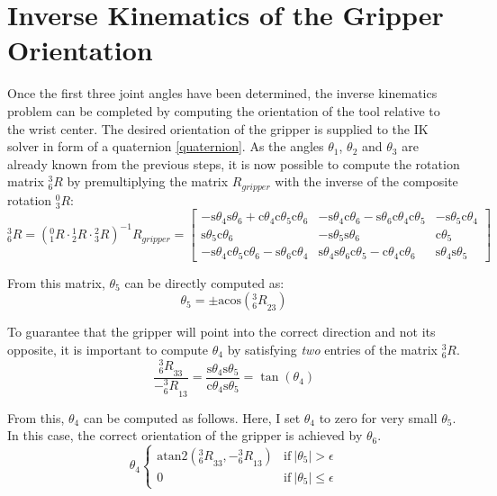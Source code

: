 \documentclass[twoside]{article}
\renewcommand{\c}{\text{c}}
\newcommand{\s}{\text{s}}
\newcommand{\R}[2]{\mbox{$_{#2}^{#1}{R}$}}
\newcommand{\acos}{\text{acos}}
\begin{document}
\section{Inverse Kinematics of the Gripper Orientation}
Once the first three joint angles have been determined, the inverse kinematics problem can be
completed by computing the orientation of the tool relative to the wrist center. The desired
orientation of the gripper is supplied to the IK solver in form of a quaternion \ref{quaternion}.
As the angles $\theta_1$, $\theta_2$ and $\theta_3$ are already known from the previous steps,
it is now possible to compute the rotation matrix $\R{3}{6}$ by premultiplying the matrix $R_{gripper}$
with the inverse of the composite rotation $\R{0}{3}$:
\begin{equation}
  \R{3}{6} = (\R{0}{1}\cdot \R{1}{2}\cdot \R{2}{3})^{-1} R_{gripper} =
  \begin{bmatrix}
    -\s\theta_4 \s\theta_6 + \c\theta_4\c\theta_5 \c\theta_6 & -\s\theta_4 \c\theta_6 - \s\theta_6 \c\theta_4 \c\theta_5 & -\s\theta_5 \c\theta_4 \\
                                        \s\theta_5 \c\theta_6 &                                    -\s\theta_5 \s\theta_6 &             \c\theta_5 \\
    -\s\theta_4 \c\theta_5 \c\theta_6 - \s\theta_6 \c\theta_4 &  \s\theta_4 \s\theta_6 \c\theta_5 - \c\theta_4 \c\theta_6 &  \s\theta_4 \s\theta_5
  \end{bmatrix}
\end{equation}

From this matrix, $\theta_5$ can be directly computed as:
\begin{equation}
  \theta_5 = \pm\acos(\R{3}{6}_{23})
\end{equation}

To guarantee that the gripper will point into the correct direction and not its opposite,
it is important to compute $\theta_4$  by satisfying \emph{two} entries of the matrix
$\R{3}{6}$.
\begin{equation}
  \frac{\R{3}{6}_{33}}{-\R{3}{6}_{13}} = \frac{\s\theta_4\s\theta_5}{\c\theta_4\s\theta_5} = \tan(\theta_4)
\end{equation}

From this, $\theta_4$ can be computed as follows. Here, I set $\theta_4$ to zero for very small
$\theta_5$. In this case, the correct orientation of the gripper is achieved by $\theta_6$.
\begin{equation}
  \theta_4
  \begin{cases}
    \text{atan2}\left(\R{3}{6}_{33}, -\R{3}{6}_{13}\right) & \text{if}\ |\theta_5| > \epsilon \\
    0                                           & \text{if}\ |\theta_5| \leq \epsilon
  \end{cases}
\end{equation}
\end{document}
